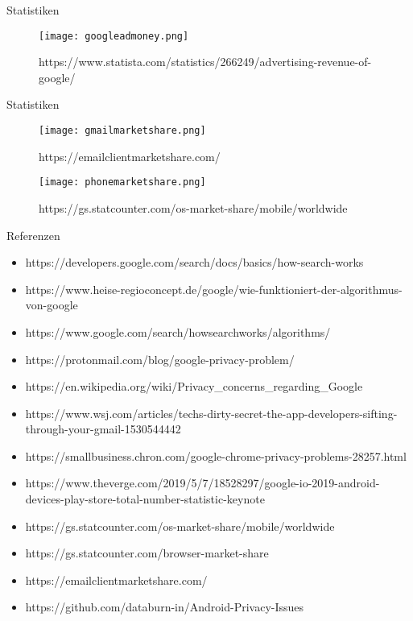 \documentclass[11pt]{beamer}
\begin{document}
\begin{frame}{Statistiken}
    \begin{figure}
        \centering
        \texttt{[image: googleadmoney.png]}
        \caption{\tiny https://www.statista.com/statistics/266249/advertising-revenue-of-google/}
    \end{figure}
\end{frame}

\begin{frame}{Statistiken}
        \begin{figure}
        \centering
        \texttt{[image: gmailmarketshare.png]}
        \caption{\tiny https://emailclientmarketshare.com/}
    \end{figure}

    \begin{figure}
        \centering
        \texttt{[image: phonemarketshare.png]}
        \caption{\tiny https://gs.statcounter.com/os-market-share/mobile/worldwide}
    \end{figure}
\end{frame}



\begin{frame}{Referenzen}
    \begin{itemize}
    \tiny
        \item https://developers.google.com/search/docs/basics/how-search-works
        \item https://www.heise-regioconcept.de/google/wie-funktioniert-der-algorithmus-von-google
        \item https://www.google.com/search/howsearchworks/algorithms/
        \item https://protonmail.com/blog/google-privacy-problem/
        \item https://en.wikipedia.org/wiki/Privacy\_concerns\_regarding\_Google
        \item https://www.wsj.com/articles/techs-dirty-secret-the-app-developers-sifting-through-your-gmail-1530544442
        \item https://smallbusiness.chron.com/google-chrome-privacy-problems-28257.html
        \item https://www.theverge.com/2019/5/7/18528297/google-io-2019-android-devices-play-store-total-number-statistic-keynote
        \item https://gs.statcounter.com/os-market-share/mobile/worldwide
        \item https://gs.statcounter.com/browser-market-share
        \item https://emailclientmarketshare.com/
        \item https://github.com/databurn-in/Android-Privacy-Issues
    \end{itemize}
\end{frame}
\end{document}
